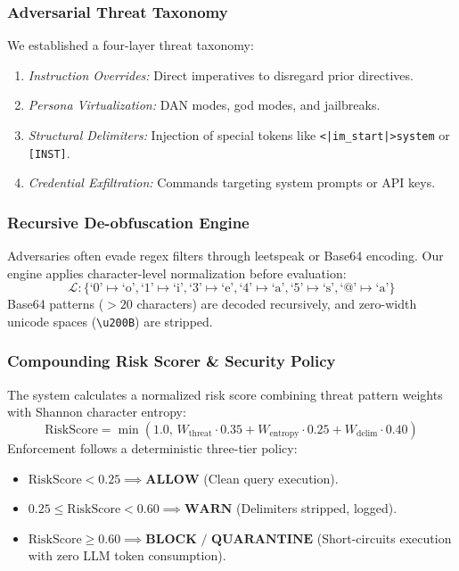 \documentclass[conference]{IEEEtran}
\begin{document}
\subsubsection{Adversarial Threat Taxonomy}
We established a four-layer threat taxonomy:
\begin{enumerate}
    \item \textit{Instruction Overrides:} Direct imperatives to disregard prior directives.
    \item \textit{Persona Virtualization:} DAN modes, god modes, and jailbreaks.
    \item \textit{Structural Delimiters:} Injection of special tokens like \texttt{<|im\_start|>system} or \texttt{[INST]}.
    \item \textit{Credential Exfiltration:} Commands targeting system prompts or API keys.
\end{enumerate}

\subsubsection{Recursive De-obfuscation Engine}
Adversaries often evade regex filters through leetspeak or Base64 encoding. Our engine applies character-level normalization before evaluation:
\begin{equation}
\mathcal{L}: \{ \text{`0'}\mapsto\text{`o'}, \text{`1'}\mapsto\text{`i'}, \text{`3'}\mapsto\text{`e'}, \text{`4'}\mapsto\text{`a'}, \text{`5'}\mapsto\text{`s'}, \text{`@'}\mapsto\text{`a'} \}
\end{equation}
Base64 patterns ($>20$ characters) are decoded recursively, and zero-width unicode spaces (\texttt{\textbackslash u200B}) are stripped.

\subsubsection{Compounding Risk Scorer \& Security Policy}
The system calculates a normalized risk score combining threat pattern weights with Shannon character entropy:
\begin{equation}
\text{RiskScore} = \min(1.0, \, W_{\text{threat}} \cdot 0.35 + W_{\text{entropy}} \cdot 0.25 + W_{\text{delim}} \cdot 0.40)
\end{equation}
Enforcement follows a deterministic three-tier policy:
\begin{itemize}
    \item $\text{RiskScore} < 0.25 \implies \textbf{ALLOW}$ (Clean query execution).
    \item $0.25 \le \text{RiskScore} < 0.60 \implies \textbf{WARN}$ (Delimiters stripped, logged).
    \item $\text{RiskScore} \ge 0.60 \implies \textbf{BLOCK / QUARANTINE}$ (Short-circuits execution with zero LLM token consumption).
\end{itemize}
\end{document}
